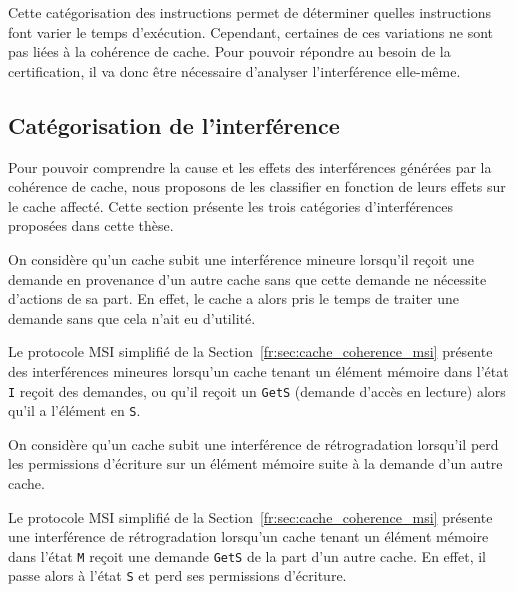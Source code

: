 Cette catégorisation des instructions permet de déterminer quelles
instructions font varier le temps d'exécution. Cependant, certaines de ces
variations ne sont pas liées à la cohérence de cache. Pour
pouvoir répondre au besoin de la certification, il va donc être
nécessaire d'analyser l'interférence elle-même.

\subsection{Catégorisation de l'interférence}
\label{fr:sec:analysis:exposing_interference}
Pour pouvoir comprendre la cause et les effets des interférences générées par
la cohérence de cache, nous proposons de les classifier en fonction de leurs effets
sur le cache affecté. Cette section présente les trois catégories
d'interférences proposées dans cette thèse.

\begin{definition}
On considère qu'un cache subit une interférence mineure lorsqu'il reçoit une
demande en provenance d'un autre cache sans que cette demande ne nécessite
d'actions de sa part. En effet, le cache a alors pris le temps de traiter une
demande sans que cela n'ait eu d'utilité.
\end{definition}

\begin{example}
Le protocole MSI simplifié de la Section~\ref{fr:sec:cache_coherence_msi}
présente des interférences mineures lorsqu'un cache tenant un élément mémoire
dans l'état \texttt{I} reçoit des demandes, ou qu'il reçoit un \texttt{GetS}
(demande d'accès en lecture) alors qu'il a l'élément en \texttt{S}.
\end{example}

\begin{definition}
On considère qu'un cache subit une interférence de rétrogradation lorsqu'il
perd les permissions d'écriture sur un élément mémoire suite à la demande d'un
autre cache.
\end{definition}

\begin{example}
Le protocole MSI simplifié de la Section~\ref{fr:sec:cache_coherence_msi}
présente une interférence de rétrogradation lorsqu'un cache tenant un élément
mémoire dans l'état \texttt{M} reçoit une demande \texttt{GetS} de la part d'un
autre cache. En effet, il passe alors à l'état \texttt{S} et perd ses
permissions d'écriture.
\end{example}

